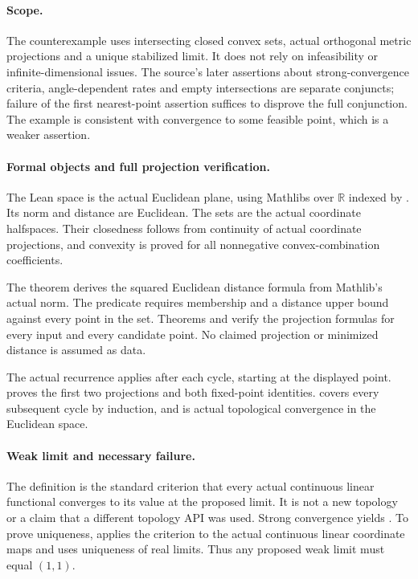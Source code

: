 \documentclass[11pt]{article}
\begin{document}
\newpage
\paragraph{Scope.}
The counterexample uses intersecting closed convex sets, actual orthogonal metric projections and a unique stabilized limit. It does not rely on infeasibility or infinite-dimensional issues. The source's later assertions about strong-convergence criteria, angle-dependent rates and empty intersections are separate conjuncts; failure of the first nearest-point assertion suffices to disprove the full conjunction. The example is consistent with convergence to some feasible point, which is a weaker assertion.

\paragraph{Formal objects and full projection verification.}
The Lean space is the actual Euclidean plane, using Mathlib\textquotesingle s  over $\mathbb R$ indexed by . Its norm and distance are Euclidean. The sets are the actual coordinate halfspaces. Their closedness follows from continuity of actual coordinate projections, and convexity is proved for all nonnegative convex-combination coefficients.

The theorem  derives the squared Euclidean distance formula from Mathlib's actual norm. The predicate  requires membership and a distance upper bound against every point in the set. Theorems  and  verify the projection formulas for every input and every candidate point. No claimed projection or minimized distance is assumed as data.

The actual recurrence  applies  after  each cycle, starting at the displayed point.  proves the first two projections and both fixed-point identities.  covers every subsequent cycle by induction, and  is actual topological convergence in the Euclidean space.

\paragraph{Weak limit and necessary failure.}
The definition  is the standard criterion that every actual continuous linear functional converges to its value at the proposed limit. It is not a new topology or a claim that a different topology API was used. Strong convergence yields . To prove uniqueness,  applies the criterion to the actual continuous linear coordinate maps and uses uniqueness of real limits. Thus any proposed weak limit must equal $(1,1)$.
\end{document}

